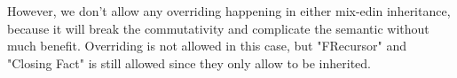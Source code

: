 
However, we don't allow any overriding happening in either mix-edin inheritance, because it will break the commutativity and complicate the semantic without much benefit. Overriding is not allowed in this case, but "FRecursor" and "Closing Fact" is still allowed since they only allow to be inherited. 







